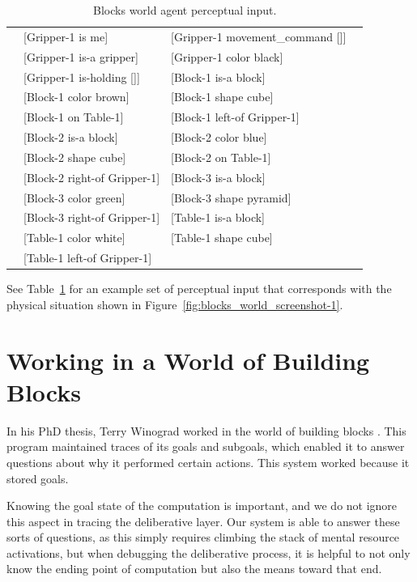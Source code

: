 \begin{table}
  \myfloatalign
  \begin{tabularx}{\textwidth}{XllX}
    & [Gripper-1 is me] & [Gripper-1 movement\_command []] & \\
    & [Gripper-1 is-a gripper] & [Gripper-1 color black] & \\
    & [Gripper-1 is-holding []] & [Block-1 is-a block] & \\
    & [Block-1 color brown] & [Block-1 shape cube] & \\
    & [Block-1 on Table-1] & [Block-1 left-of Gripper-1] & \\
    & [Block-2 is-a block] & [Block-2 color blue] & \\
    & [Block-2 shape cube] & [Block-2 on Table-1] & \\
    & [Block-2 right-of Gripper-1] & [Block-3 is-a block] & \\
    & [Block-3 color green] & [Block-3 shape pyramid] & \\
    & [Block-3 right-of Gripper-1] & [Table-1 is-a block] & \\
    & [Table-1 color white] & [Table-1 shape cube] & \\
    & [Table-1 left-of Gripper-1] & &
  \end{tabularx}
  \caption[Blocks world agent perceptual input.]{Blocks world agent perceptual input.}
  \label{tab:blocks_world_agent_perceptions}
\end{table}

See Table~\ref{tab:blocks_world_agent_perceptions} for an example set of perceptual input that corresponds with the physical situation shown in Figure~\ref{fig:blocks_world_screenshot-1}.

\section{Working in a World of Building Blocks}

In his PhD thesis, Terry Winograd worked in the world of building
blocks \citep{winograd:1970}.  This program maintained traces of its
goals and subgoals, which enabled it to answer questions about why it
performed certain actions.  This system worked because it stored
goals.

Knowing the goal state of the computation is important, and we do not
ignore this aspect in tracing the deliberative layer.  Our system is
able to answer these sorts of questions, as this simply requires
climbing the stack of mental resource activations, but when debugging
the deliberative process, it is helpful to not only know the ending
point of computation but also the means toward that end.

